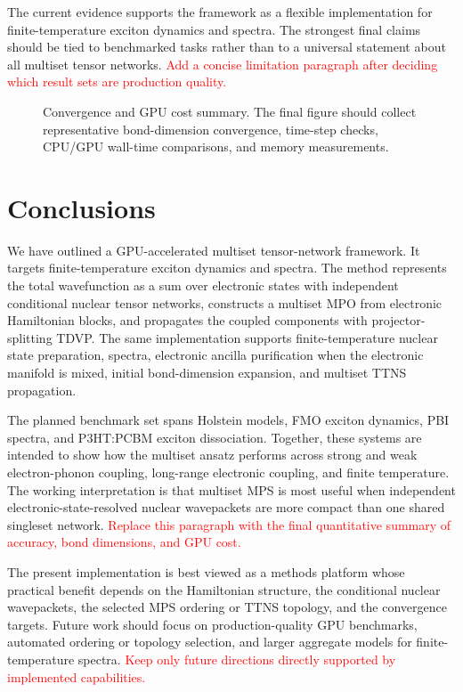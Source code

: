 \documentclass[journal=jctcce,manuscript=article]{achemso}
\newcommand{\placeholder}[1]{\textcolor{red}{#1}}
\newcommand{\figureplaceholder}[2]{%
\begin{figure}[htbp]
    \centering
    \fbox{%
    \begin{minipage}[c][0.24\textheight][c]{0.82\textwidth}
        \centering
        \textbf{Figure dummy: #1}\\[0.5em]
        \placeholder{#2}
    \end{minipage}}
    \caption{#2}
    \label{fig:#1}
\end{figure}}
\begin{document}
The current evidence supports the framework as a flexible implementation for finite-temperature exciton dynamics and spectra. The strongest final claims should be tied to benchmarked tasks rather than to a universal statement about all multiset tensor networks. \placeholder{Add a concise limitation paragraph after deciding which result sets are production quality.}

\figureplaceholder{cost-convergence}{Convergence and GPU cost summary. The final figure should collect representative bond-dimension convergence, time-step checks, CPU/GPU wall-time comparisons, and memory measurements.}

\section{Conclusions}

We have outlined a GPU-accelerated multiset tensor-network framework. It targets finite-temperature exciton dynamics and spectra. The method represents the total wavefunction as a sum over electronic states with independent conditional nuclear tensor networks, constructs a multiset MPO from electronic Hamiltonian blocks, and propagates the coupled components with projector-splitting TDVP. The same implementation supports finite-temperature nuclear state preparation, spectra, electronic ancilla purification when the electronic manifold is mixed, initial bond-dimension expansion, and multiset TTNS propagation.

The planned benchmark set spans Holstein models, FMO exciton dynamics, PBI spectra, and P3HT:PCBM exciton dissociation. Together, these systems are intended to show how the multiset ansatz performs across strong and weak electron-phonon coupling, long-range electronic coupling, and finite temperature. The working interpretation is that multiset MPS is most useful when independent electronic-state-resolved nuclear wavepackets are more compact than one shared singleset network. \placeholder{Replace this paragraph with the final quantitative summary of accuracy, bond dimensions, and GPU cost.}

The present implementation is best viewed as a methods platform whose practical benefit depends on the Hamiltonian structure, the conditional nuclear wavepackets, the selected MPS ordering or TTNS topology, and the convergence targets. Future work should focus on production-quality GPU benchmarks, automated ordering or topology selection, and larger aggregate models for finite-temperature spectra. \placeholder{Keep only future directions directly supported by implemented capabilities.}
\end{document}
